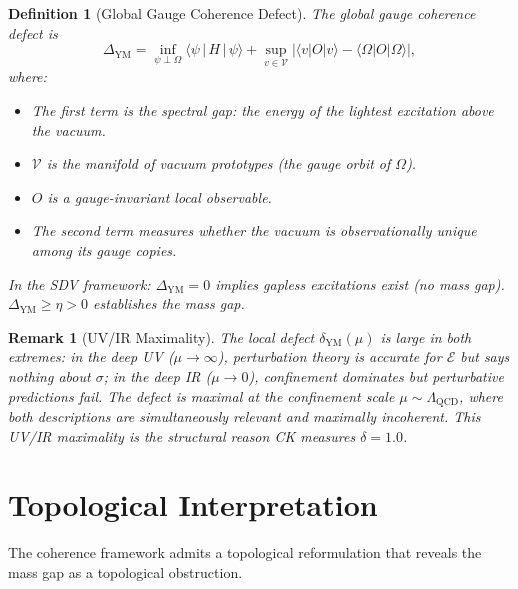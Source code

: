 \documentclass[11pt]{article}
\newtheorem{definition}[theorem]{Definition}
\newtheorem{remark}[theorem]{Remark}
\begin{document}
\begin{definition}[Global Gauge Coherence Defect]
\label{def:global-defect}
The \emph{global gauge coherence defect} is
\begin{equation}\label{eq:global-defect}
  \Delta_{\mathrm{YM}} =
  \inf_{\psi \perp \Omega}
  \bigl\langle \psi \,\big|\, H \,\big|\, \psi \bigr\rangle
  + \sup_{v \in \mathcal{V}}
  \bigl|\langle v | O | v \rangle
  - \langle \Omega | O | \Omega \rangle\bigr|,
\end{equation}
where:
\begin{itemize}
  \item The first term is the spectral gap: the energy of the lightest
    excitation above the vacuum.
  \item $\mathcal{V}$ is the manifold of vacuum prototypes (the
    gauge orbit of $\Omega$).
  \item $O$ is a gauge-invariant local observable.
  \item The second term measures whether the vacuum is observationally
    unique among its gauge copies.
\end{itemize}
In the SDV framework: $\Delta_{\mathrm{YM}} = 0$ implies gapless
excitations exist (no mass gap).
$\Delta_{\mathrm{YM}} \geq \eta > 0$ establishes the mass gap.
\end{definition}

\begin{remark}[UV/IR Maximality]
\label{rem:uvir}
The local defect $\delta_{\mathrm{YM}}(\mu)$ is large in both extremes:
in the deep UV ($\mu \to \infty$), perturbation theory is accurate for
$\mathcal{E}$ but says nothing about $\sigma$; in the deep IR
($\mu \to 0$), confinement dominates but perturbative predictions fail.
The defect is maximal at the confinement scale
$\mu \sim \Lambda_{\mathrm{QCD}}$, where both descriptions are
simultaneously relevant and maximally incoherent.  This UV/IR maximality
is the structural reason CK measures $\delta = 1.0$.
\end{remark}

\section{Topological Interpretation}
\label{sec:topology}

The coherence framework admits a topological reformulation that reveals
the mass gap as a topological obstruction.
\end{document}

